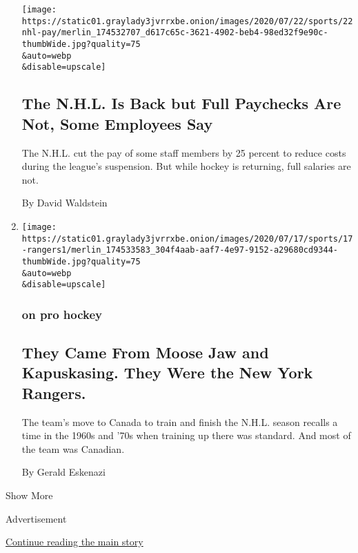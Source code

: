 \begin{enumerate}
  \texttt{[image: https://static01.graylady3jvrrxbe.onion/images/2020/07/22/sports/22nhl-pay/merlin\_174532707\_d617c65c-3621-4902-beb4-98ed32f9e90c-thumbWide.jpg?quality=75\\\&auto=webp\\\&disable=upscale]}

  \hypertarget{the-nhl-is-back-but-full-paychecks-are-not-some-employees-say}{%
  \subsection{The N.H.L. Is Back but Full Paychecks Are Not, Some
  Employees
  Say}\label{the-nhl-is-back-but-full-paychecks-are-not-some-employees-say}}

  The N.H.L. cut the pay of some staff members by 25 percent to reduce
  costs during the league's suspension. But while hockey is returning,
  full salaries are not.

  By David Waldstein
\item
  \href{/2020/07/19/sports/hockey/coronavirus-nhl-canada-season.html}{}

  \texttt{[image: https://static01.graylady3jvrrxbe.onion/images/2020/07/17/sports/17-rangers1/merlin\_174533583\_304f4aab-aaf7-4e97-9152-a29680cd9344-thumbWide.jpg?quality=75\\\&auto=webp\\\&disable=upscale]}

  \hypertarget{on-pro-hockey}{%
  \subsubsection{on pro hockey}\label{on-pro-hockey}}

  \hypertarget{they-came-from-moose-jaw-and-kapuskasing-they-were-the-new-york-rangers}{%
  \subsection{They Came From Moose Jaw and Kapuskasing. They Were the
  New York
  Rangers.}\label{they-came-from-moose-jaw-and-kapuskasing-they-were-the-new-york-rangers}}

  The team's move to Canada to train and finish the N.H.L. season
  recalls a time in the 1960s and '70s when training up there was
  standard. And most of the team was Canadian.

  By Gerald Eskenazi
\end{enumerate}

Show More

Advertisement

\protect\hyperlink{after-mid1}{Continue reading the main story}

